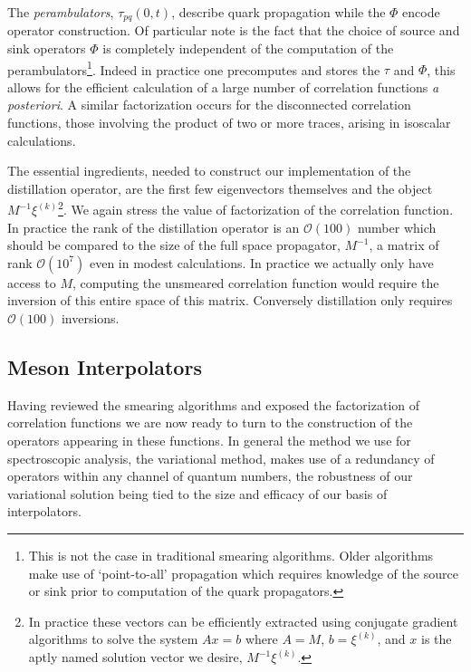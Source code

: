 The \emph{perambulators}, $\tau_{pq}(0,t)$, describe quark propagation while the $\Phi$ encode operator construction. Of particular note is the fact that the choice of source and sink operators $\Phi$ is completely independent of the computation of the perambulators\footnote{This is not the case in traditional smearing algorithms. Older algorithms make use of `point-to-all' propagation which requires knowledge of the source or sink prior to computation of the quark propagators.}. Indeed in practice one precomputes and stores the $\tau$ and $\Phi$, this allows for the efficient calculation of a large number of correlation functions \emph{a posteriori}. A similar factorization occurs for the disconnected correlation functions, those involving the product of two or more traces, arising in isoscalar calculations. 

The essential ingredients, needed to construct our implementation of the distillation operator, are the first few eigenvectors themselves and the object $M^{-1}\xi^{(k)}$\footnote{In practice these vectors can be efficiently extracted using conjugate gradient algorithms to solve the system $Ax=b$ where $A=M$, $b=\xi^{(k)}$, and $x$ is the aptly named solution vector we desire, $M^{-1}\xi^{(k)}$.}. We again stress the value of factorization of the correlation function. In practice the rank of the distillation operator is an $\mathcal{O}(100)$ number which should be compared to the size of the full space propagator, $M^{-1}$, a matrix of rank $\mathcal{O}(10^7)$ even in modest calculations. In practice we actually only have access to $M$, computing the unsmeared correlation function would require the inversion of this entire space of this matrix. Conversely distillation only requires $\mathcal{O}(100)$ inversions. 

\subsection{Meson Interpolators} \label{sec::Spec:ops:MesOps}

Having reviewed the smearing algorithms and exposed the factorization of correlation functions we are now ready to turn to the construction of the operators appearing in these functions. In general the method we use for spectroscopic analysis, the variational method, makes use of a redundancy of operators within any channel of quantum numbers, the robustness of our variational solution being tied to the size and efficacy of our basis of interpolators. 

